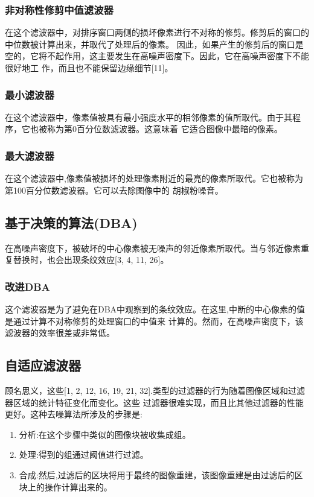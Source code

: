 \documentclass{article} %
\begin{document}
\subsubsection{非对称性修剪中值滤波器}
在这个滤波器中，对排序窗口两侧的损坏像素进行不对称的修剪。修剪后的窗口的中位数被计算出来，并取代了处理后的像素。
因此，如果产生的修剪后的窗口是空的，它将不起作用，这主要发生在高噪声密度下。因此，它在高噪声密度下不能很好地工
作，而且也不能保留边缘细节[11]。

\subsubsection{最小滤波器}
在这个滤波器中，像素值被具有最小强度水平的相邻像素的值所取代。由于其程序，它也被称为第0百分位数滤波器。这意味着
它适合图像中最暗的像素。

\subsubsection{最大滤波器}
在这个滤波器中,像素值被损坏的处理像素附近的最亮的像素所取代。它也被称为第100百分位数滤波器。它可以去除图像中的
胡椒粉噪音。

\subsection{基于决策的算法(DBA)}
在高噪声密度下，被破坏的中心像素被无噪声的邻近像素所取代。当与邻近像素重复替换时，也会出现条纹效应[3, 4, 11, 26]。

\subsubsection{改进DBA}
这个滤波器是为了避免在DBA中观察到的条纹效应。在这里,中断的中心像素的值是通过计算不对称修剪的处理窗口的中值来
计算的。然而，在高噪声密度下，该滤波器的效率很差或非常低。

\subsection{自适应滤波器}
顾名思义，这些[1, 2, 12, 16, 19, 21, 32].类型的过滤器的行为随着图像区域和过滤器区域的统计特征变化而变化。这些
过滤器很难实现，而且比其他过滤器的性能更好。这种去噪算法所涉及的步骤是:
\begin{enumerate}
    \item 分析:在这个步骤中类似的图像块被收集成组。
    \item 处理:得到的组通过阈值进行过滤。
    \item 合成:然后,过滤后的区块将用于最终的图像重建，该图像重建是由过滤后的区块上的操作计算出来的。
\end{enumerate}
\end{document}
